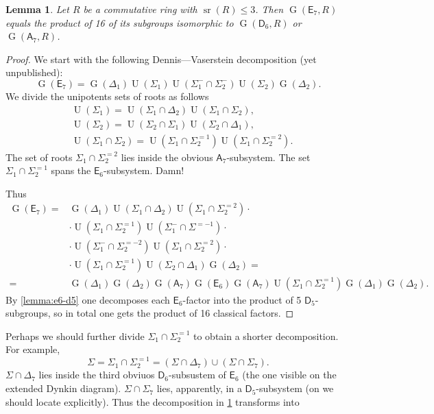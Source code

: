 \documentclass[oneside, 12pt]{amsart}
\theoremstyle{plain}
\numberwithin{equation}{section}
\newtheorem{lemma}{Lemma}
\numberwithin{lemma}{section}
\theoremstyle{definition}
\theoremstyle{remark}
\DeclareMathOperator{\G}{G}
\DeclareMathOperator{\U}{U}
\DeclareMathOperator{\sr}{sr}
\newcommand{\rA}{\mathsf{A}}
\newcommand{\rD}{\mathsf{D}}
\newcommand{\rE}{\mathsf{E}}
\begin{document}
\begin{lemma}\label{lemma:e7-aldl}
Let $R$ be a commutative ring with $\sr(R)\leqslant3$. Then $\G(\rE_7, R)$ equals the product of 16 of its subgroups isomorphic to $\G(\rD_6, R)$ or $\G(\rA_7, R)$.
\end{lemma}
\begin{proof}
We start with the following Dennis---Vaserstein decomposition (yet unpublished):
\[ \G(\rE_7) = \G(\Delta_1) \U(\Sigma_1) \U(\Sigma_1^-\cap\Sigma_2^-) \U(\Sigma_2) \G(\Delta_2). \]
We divide the unipotents sets of roots as follows
\begin{align*}
& \U(\Sigma_1) = \U(\Sigma_1\cap\Delta_2) \U(\Sigma_1\cap\Sigma_2), \\
& \U(\Sigma_2) = \U(\Sigma_2\cap\Sigma_1) \U(\Sigma_2\cap\Delta_1), \\
& \U(\Sigma_1\cap\Sigma_2) = \U(\Sigma_1\cap\Sigma_2^{=1}) \U(\Sigma_1\cap\Sigma_2^{=2}).
\end{align*}
The set of roots $\Sigma_1\cap\Sigma_2^{=2}$ lies inside the obvious $\rA_7$-subsystem. The set $\Sigma_1\cap\Sigma_2^{=1}$ spans the $\rE_6$-subsystem. Damn!

Thus
\begin{align*}
\G(\rE_7) ={} & \G(\Delta_1) \U(\Sigma_1\cap\Delta_2) \U(\Sigma_1\cap\Sigma_2^{=2}) \cdot{} \\
& \cdot \U(\Sigma_1\cap\Sigma_2^{=1}) \U(\Sigma_1^-\cap\Sigma^{=-1}) \cdot{} \\
& \cdot \U(\Sigma_1^-\cap\Sigma_2^{=-2}) \U(\Sigma_1\cap\Sigma_2^{=2}) \cdot{} \\
& \cdot \U(\Sigma_1\cap\Sigma_2^{=1}) \U(\Sigma_2\cap\Delta_1) \G(\Delta_2) = \\
={} & \G(\Delta_1) \G(\Delta_2) \G(\rA_7) \G(\rE_6) \G(\rA_7) \U(\Sigma_1\cap\Sigma_2^{=1}) \G(\Delta_1) \G(\Delta_2).
\end{align*}
By \cref{lemma:e6-d5} one decomposes each $\rE_6$-factor into the product of 5 $\rD_5$-subgroups, so in total one gets the product of 16 classical factors.
\end{proof}
Perhaps we should further divide $\Sigma_1\cap\Sigma_2^{=1}$ to obtain a shorter decomposition. For example,
\[ \Sigma = \Sigma_1\cap\Sigma_2^{=1} = (\Sigma\cap\Delta_7) \cup (\Sigma\cap\Sigma_7). \]
$\Sigma\cap\Delta_7$ lies inside the third obviuos $\rD_6$-subsustem of $\rE_6$ (the one visible on the extended Dynkin diagram). $\Sigma\cap\Sigma_7$ lies, apparently, in a $\rD_5$-subsystem (on we should locate explicitly). Thus the decomposition in \cref{lemma:e7-aldl} transforms into
\end{document}
